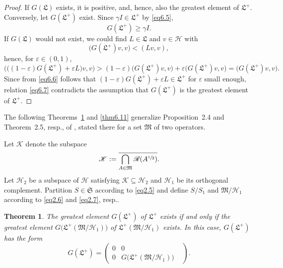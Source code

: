 \documentclass[12pt, a4paper, reqno, twoside]{amsart}
\numberwithin{equation}{section}
\newcommand{\frakS}{\mathfrak S}
\newcommand{\frakL}{\mathfrak L}
\newcommand{\frakM}{\mathfrak M}
\newtheorem{theorem}{Theorem}[section]
\theoremstyle{definition}
\theoremstyle{remark}
\theoremstyle{mystyle}
\begin{document}
\begin{proof}
If $G(\frakL)$ exists, it is positive, and, hence, also the greatest
element of $\frakL^{+}$. Conversely, let $G(\frakL^{+})$ exist. Since
$\gamma I\in\frakL^{+}$ by \eqref{eq6.5},
\begin{equation}
\label{eq6.6}
G(\frakL^{+})\geq\gamma I.  
\end{equation}
If $G(\frakL)$ would not exist, we could find $L\in\frakL$ and
$v\in\mathscr H$ with
\[
  \bigl(G(\frakL^{+})v,v\bigr) < (Lv,v),
\]
hence, for $\varepsilon\in(0,1)$,
\begin{equation}
\label{eq6.7}
\bigl(\bigl((1-\varepsilon)G(\frakL^{+})+\varepsilon L\bigr)v,v\bigr) >
  (1-\varepsilon)\bigl(G(\frakL^{+})v,v\bigr) +
  \varepsilon\bigl(G(\frakL^{+})v,v\bigr) 
= \bigl(G(\frakL^{+})v,v\bigr).
\end{equation}
Since from \eqref{eq6.6} follows that $(1-
\varepsilon)G(\frakL^{+})+\varepsilon L\in\frakL^{+}$ for $\varepsilon$
small enough, relation \eqref{eq6.7} contradicts the assumption that
$G(\frakL^{+})$ is the greatest element of $\frakL^{+}$.
\end{proof}

The following Theorems~\ref{thm6.8} and \ref{thm6.11} generalize
Proposition~2.4 and Theorem~2.5, resp., of
\cite{GheondeaGudderJonas2005}, stated there for a set $\frakM$ of two operators.

Let $\mathscr K$ denote the subspace 
\begin{equation}
\label{eq6.7a}
\mathscr K:=
\overline{\bigcap_{A\in\frakM}\mathscr R(A^{\sfrac{1}{2}})}.
\end{equation}
Let $\mathscr H_{2}$ be a subspace of $\mathscr H$ satisfying
$\mathscr K\subseteq\mathscr H_{2}$  and $\mathscr H_{1}$ be its orthogonal
complement. Partition $S\in\frakS$ according to \eqref{eq2.5} and
define $S/S_{1}$ and $\frakM/\mathscr H_{1}$ according to
\eqref{eq2.6}  and \eqref{eq2.7}, resp..

\begin{theorem}
\label{thm6.8}
The greatest element $G(\frakL^{+})$ of $\frakL^{+}$ exists if and only
if the greatest element $G\bigl(\frakL^{+}(\frakM/\mathscr H_{1})\bigr)$
of $\frakL^{+}(\frakM/\mathscr H_{1})$ exists. In this case,
$G(\frakL^{+})$ has the form
\[
  G(\frakL^{+}) =
  \begin{pmatrix}
  0 & 0 & \\ 0 & G\bigl(\frakL^{+}(\frakM/\mathscr H_{1})\bigr)
  \end{pmatrix}.
\]
\end{theorem}
\end{document}
